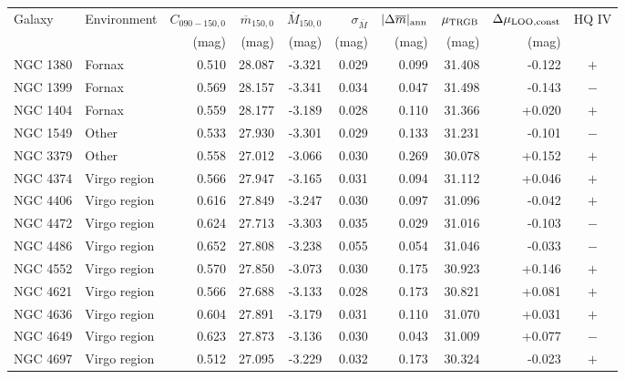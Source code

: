 \begin{tabular}{llrrrrrrrc}
\toprule
Galaxy & Environment & $C_{090-150,0}$ & $\overline m_{150,0}$ &
$\overline M_{150,0}$ & $\sigma_{\overline M}$ &
$|\Delta\overline m|_{\rm ann}$ & $\mu_{\rm TRGB}$ &
$\Delta\mu_{\rm LOO,const}$ & HQ IV \\
 & & (mag) & (mag) & (mag) & (mag) & (mag) & (mag) & (mag) & \\
\midrule
NGC 1380 & Fornax & 0.510 & 28.087 & -3.321 & 0.029 & 0.099 & 31.408 & -0.122 & $+$ \\
NGC 1399 & Fornax & 0.569 & 28.157 & -3.341 & 0.034 & 0.047 & 31.498 & -0.143 & $-$ \\
NGC 1404 & Fornax & 0.559 & 28.177 & -3.189 & 0.028 & 0.110 & 31.366 & +0.020 & $+$ \\
NGC 1549 & Other & 0.533 & 27.930 & -3.301 & 0.029 & 0.133 & 31.231 & -0.101 & $-$ \\
NGC 3379 & Other & 0.558 & 27.012 & -3.066 & 0.030 & 0.269 & 30.078 & +0.152 & $+$ \\
NGC 4374 & Virgo region & 0.566 & 27.947 & -3.165 & 0.031 & 0.094 & 31.112 & +0.046 & $+$ \\
NGC 4406 & Virgo region & 0.616 & 27.849 & -3.247 & 0.030 & 0.097 & 31.096 & -0.042 & $+$ \\
NGC 4472 & Virgo region & 0.624 & 27.713 & -3.303 & 0.035 & 0.029 & 31.016 & -0.103 & $-$ \\
NGC 4486 & Virgo region & 0.652 & 27.808 & -3.238 & 0.055 & 0.054 & 31.046 & -0.033 & $-$ \\
NGC 4552 & Virgo region & 0.570 & 27.850 & -3.073 & 0.030 & 0.175 & 30.923 & +0.146 & $+$ \\
NGC 4621 & Virgo region & 0.566 & 27.688 & -3.133 & 0.028 & 0.173 & 30.821 & +0.081 & $+$ \\
NGC 4636 & Virgo region & 0.604 & 27.891 & -3.179 & 0.031 & 0.110 & 31.070 & +0.031 & $+$ \\
NGC 4649 & Virgo region & 0.623 & 27.873 & -3.136 & 0.030 & 0.043 & 31.009 & +0.077 & $-$ \\
NGC 4697 & Virgo region & 0.512 & 27.095 & -3.229 & 0.032 & 0.173 & 30.324 & -0.023 & $+$ \\
\bottomrule
\end{tabular}

